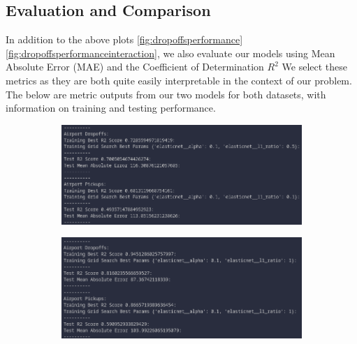 \documentclass[11pt]{article}
\begin{document}
\subsection{Evaluation and Comparison}

In addition to the above plots \ref{fig:dropoffsperformance} \ref{fig:dropoffsperformanceinteraction}, we also evaluate our models using Mean Absolute Error (MAE) and the Coefficient of Determination $R^2$
We select these metrics as they are both quite easily interpretable in the context of our problem. The below are metric outputs from our two models for both datasets, with information on training and testing performance. 
\begin{figure}[H]
    \caption{Model Test \& Train Output Metrics}
    \label{fig:metrics}
    \begin{subfigure}{.5\textwidth}
        \includegraphics[width=1\textwidth]{plots/output.png}
    \end{subfigure}
    \begin{subfigure}{.5\textwidth}
        \includegraphics[width=1\textwidth]{plots/Interaction_output.png}
    \end{subfigure}
\end{figure}
\end{document}

